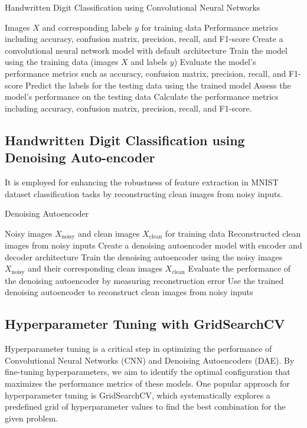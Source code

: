\begin{algorithm}
    \caption{Handwritten Digit Classification using Convolutional Neural Networks}
    \begin{algorithmic}[1]
        \Require Images $X$ and corresponding labels $y$ for training data
        \Ensure Performance metrics including accuracy, confusion matrix, precision, recall, and F1-score
        \State Create a convolutional neural network model with default architecture
        \State Train the model using the training data (images $X$ and labels $y$)
        \State Evaluate the model's performance metrics such as accuracy, confusion matrix, precision, recall, and F1-score
        \State Predict the labels for the testing data using the trained model
        \State Assess the model's performance on the testing data
        \State Calculate the performance metrics including accuracy, confusion matrix, precision, recall, and F1-score.
    \end{algorithmic}
\end{algorithm}

\subsection{Handwritten Digit Classification using Denoising Auto-encoder}

It is employed for enhancing the robustness of feature extraction in MNIST dataset classification tasks by reconstructing clean images from noisy inputs.


\begin{algorithm}
    \caption{Denoising Autoencoder}
        \begin{algorithmic}[1]
            \Require Noisy images $X_{\text{noisy}}$ and clean images $X_{\text{clean}}$ for training data
            \Ensure Reconstructed clean images from noisy inputs
            \State Create a denoising autoencoder model with encoder and decoder architecture
            \State Train the denoising autoencoder using the noisy images $X_{\text{noisy}}$ and their corresponding clean images $X_{\text{clean}}$
            \State Evaluate the performance of the denoising autoencoder by measuring reconstruction error
            \State Use the trained denoising autoencoder to reconstruct clean images from noisy inputs
        \end{algorithmic}
\end{algorithm}

\subsection{Hyperparameter Tuning with GridSearchCV}
Hyperparameter tuning is a critical step in optimizing the performance of Convolutional Neural Networks (CNN) and Denoising Autoencoders (DAE). By fine-tuning hyperparameters, we aim to identify the optimal configuration that maximizes the performance metrics of these models. One popular approach for hyperparameter tuning is GridSearchCV, which systematically explores a predefined grid of hyperparameter values to find the best combination for the given problem.

